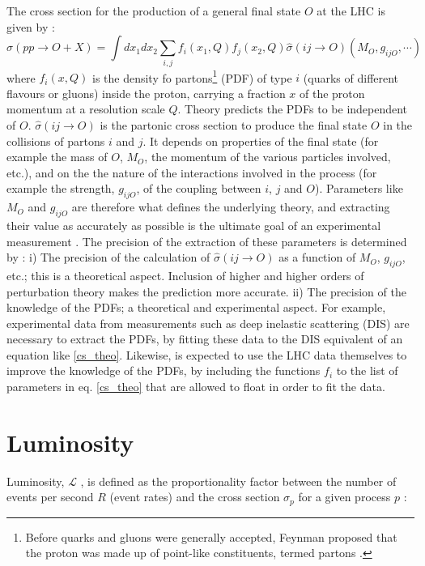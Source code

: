The cross section for the production of a general final state $O$ at the LHC is given by \cite{lumi_motiv}:
\begin{equation}
  \sigma (pp\rightarrow O +X)= \int dx_{1} dx_{2} \sum_{i,j} f_{i} (x_{1},Q) f_{j}(x_{2},Q) \hat{\sigma}(ij \rightarrow O)(M_{O},g_{ijO}, \cdots)
 \label{cs_theo}
\end{equation}
where $f_{i}(x,Q)$ is the density fo partons\footnote{Before quarks and gluons were generally accepted, Feynman proposed that the proton was made up of point-like constituents, termed partons \cite{thomson_2013}.} (PDF) of type $i$ (quarks of different flavours or gluons) inside the proton, carrying a fraction $x$ of the proton momentum at a resolution scale $Q$. Theory predicts the PDFs to be independent of $O$. $\hat{\sigma}(ij \rightarrow O)$ is the partonic cross section to produce the final state $O$ in the collisions of partons $i$ and $j$. It depends on properties of the final state (for example the mass of $O$, $M_{O}$, the momentum of the various particles involved, etc.), and on the the nature of the interactions involved in the process (for example the strength, $g_{ijO}$, of the coupling between $i$, $j$ and $O$). Parameters like $M_{O}$ and $g_{ijO}$ are therefore what defines the underlying theory, and extracting their value as accurately as possible is the ultimate goal of an experimental measurement \cite{lumi_motiv}.
The precision of the extraction of these parameters is determined by \cite{lumi_motiv}:
i) The precision of the calculation of $\hat{\sigma}(ij \rightarrow O)$ as a function of $M_{O}$, $g_{ijO}$, etc.; this is a theoretical aspect. Inclusion of higher and higher orders of perturbation theory makes the prediction more accurate.
ii) The precision of the knowledge of the PDFs; a theoretical and experimental aspect. For example, experimental data from measurements such as deep inelastic scattering (DIS) are necessary to extract the PDFs, by fitting these data to the DIS equivalent of an equation like \ref{cs_theo}. Likewise, is expected to use the LHC data themselves to improve the knowledge of the PDFs, by including the functions $f_{i}$ to the list of parameters in eq. \ref{cs_theo} that are allowed to float in order to fit the data.


\section{Luminosity }

Luminosity, $\mathcal{L}$ , is defined as the proportionality factor between the number of events per second $R$ (event rates) and the cross section $\sigma_p$ for a given process $p$ \cite{ref_lib_vol3}:

